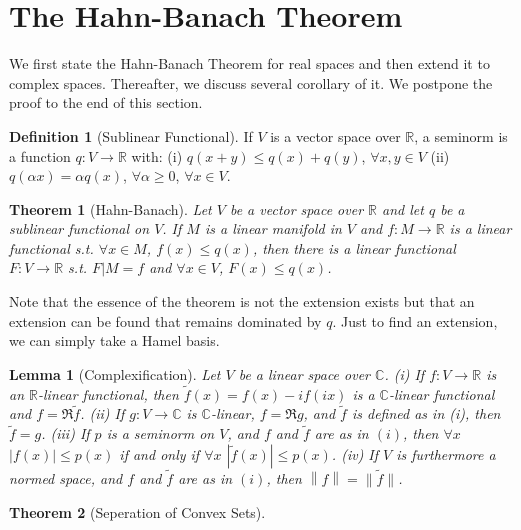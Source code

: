 \documentclass{article}
\newtheorem{theorem}{Theorem}[section]
\newtheorem{lemma}{Lemma}[section]
\theoremstyle{definition}
\newtheorem{definition}{Definition}[section]
\begin{document}
\section{The Hahn-Banach Theorem}
We first state the Hahn-Banach Theorem for real spaces and then extend it to complex spaces. Thereafter,
we discuss several corollary of it. We postpone the proof to the end of this section.
\begin{definition}[Sublinear Functional]
    If $V$ is a vector space over $\mathbb{R}$, a seminorm is a function $q:V\to \mathbb{R}$ with:\newline 
    (i) $q(x+y)\le q(x)+q(y)$, $\forall x,y\in V$ \newline
    (ii) $q(\alpha x)=\alpha q(x)$, $\forall \alpha\ge 0$, $\forall x\in V$.
\end{definition}

\begin{theorem}[Hahn-Banach]
    Let $V$ be a vector space over $\mathbb{R}$ and let $q$ be a sublinear functional on $V$. If $M$ is a
    linear manifold in $V$ and $f:M\to\mathbb{R}$ is a linear functional s.t. $\forall x\in M$, $f(x)\le q(x)$,
    then there is a linear functional $F:V\to\mathbb{R}$ s.t. $F|M=f$ and $\forall x\in V$, $F(x)\le q(x)$.
\end{theorem}
Note that the essence of the theorem is not the extension exists but that an extension can be found that remains
dominated by $q$. Just to find an extension, we can simply take a Hamel basis.

\begin{lemma}[Complexification]
    Let $V$ be a linear space over $\mathbb{C}$.\newline 
    (i) If $f:V\to\mathbb{R}$ is an $\mathbb{R}$-linear functional, then $\tilde{f}(x)=f(x)-if(ix)$ is a
    $\mathbb{C}$-linear functional and $f=\Re \tilde{f}$. \newline 
    (ii) If $g:V\to\mathbb{C}$ is $\mathbb{C}$-linear, $f=\Re g$, and $\tilde{f}$ is defined as in (i), then 
    $\tilde{f}=g$. \newline
    (iii) If $p$ is a seminorm on $V$, and $f$ and $\tilde{f}$ are as in $(i)$, then $\forall x$ $\left|f(x)\right|\le p(x)$
    if and only if $\forall x$ $|\tilde{f}(x)|\le p(x)$.\newline 
    (iv) If $V$ is furthermore a normed space, and $f$ and $\tilde{f}$ are as in $(i)$, then 
    $\left\|f\right\|=\|\tilde{f}\|$.
\end{lemma}


\begin{theorem}[Seperation of Convex Sets]
    
\end{theorem}
\end{document}
